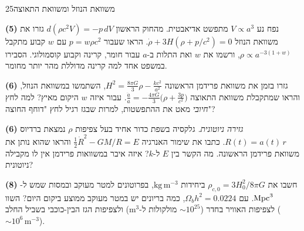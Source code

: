 \documentclass[11pt,a4paper]{article}
\begin{document}
\hwrules{}

\begin{question}{משוואת הנוזל ומשוואת התאוצה}{25}
\begin{parts}
\item \textbf{(5)} נפח נע $V\propto a^3$ מתפשט אדיאבטית. מהחוק הראשון $d(\rho c^2V)=-p\,dV$ גזרו את משוואת הנוזל $\dot\rho+3H(\rho+p/c^2)=0$. הראו שעבור $p=w\rho c^2$ עם $w$ קבוע מתקבל $\rho\propto a^{-3(1+w)}$, ורשמו את $w$ ואת התלות ב-$a$ עבור חומר, קרינה וקבוע קוסמולוגי. הסבירו במשפט אחד למה קרינה מדוללת מהר יותר מחומר.
\item \textbf{(6)} גזרו בזמן את משוואת פרידמן הראשונה $H^2=\frac{8\pi G}{3}\rho-\frac{kc^2}{a^2}$, השתמשו במשוואת הנוזל, והראו שמתקבלת משוואת התאוצה
$\displaystyle\frac{\ddot a}{a}=-\frac{4\pi G}{3}\Big(\rho+\frac{3p}{c^2}\Big)$.
עבור איזה $w$ היקום מאיץ? למה לחץ \emph{חיובי} מאט את ההתפשטות, למרות שבגז רגיל לחץ "דוחף החוצה"?
\item \textbf{(6)} \emph{גזירה ניוטונית.} גלקסיה בשפת כדור אחיד בעל צפיפות $\rho$ נמצאת ברדיוס $R(t)=a(t)\,r$. כתבו את שימור האנרגיה $\tfrac12\dot R^2-GM/R=E$ והראו שהוא נותן את משוואת פרידמן הראשונה. מה הקשר בין $E$ ל-$k$? איזה איבר במשוואות פרידמן אין לו מקבילה ניוטונית?
\item \textbf{(8)} חשבו את $\rho_{c,0}=3H_0^2/8\pi G$ ביחידות $\mathrm{kg\,m^{-3}}$, בפרוטונים למטר מעוקב ובמסות שמש ל-$\mathrm{Mpc}^3$. עם $\Omega_bh^2=0.0224$, כמה בריונים יש במטר מעוקב ממוצע ביקום היום? השוו לצפיפות האוויר בחדר ($\sim10^{25}$ מולקולות ל-$\mathrm m^3$) ולצפיפות הגז הבין-כוכבי בשביל החלב ($\sim10^{6}\,\mathrm m^{-3}$).
\end{parts}
\end{question}
\end{document}
